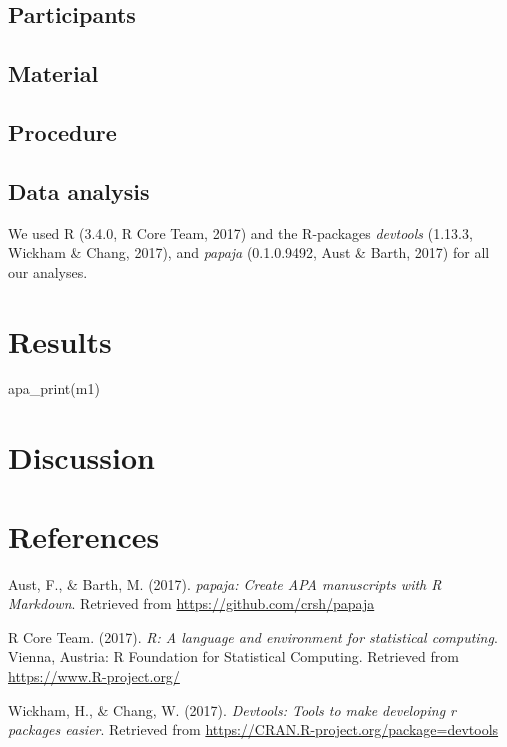 \documentclass[english,man]{apa6}
\theoremstyle{definition}
\theoremstyle{definition}
\theoremstyle{remark}
\begin{document}
\subsection{Participants}\label{participants}

\subsection{Material}\label{material}

\subsection{Procedure}\label{procedure}

\subsection{Data analysis}\label{data-analysis}

We used R (3.4.0, R Core Team, 2017) and the R-packages \emph{devtools}
(1.13.3, Wickham \& Chang, 2017), and \emph{papaja} (0.1.0.9492, Aust \&
Barth, 2017) for all our analyses.

\section{Results}\label{results}

apa\_print(m1)

\section{Discussion}\label{discussion}

\newpage

\section{References}\label{references}

\setlength{\parindent}{-0.5in} \setlength{\leftskip}{0.5in}

\hypertarget{refs}{}
\hypertarget{ref-R-papaja}{}
Aust, F., \& Barth, M. (2017). \emph{papaja: Create APA manuscripts with
R Markdown}. Retrieved from \url{https://github.com/crsh/papaja}

\hypertarget{ref-R-base}{}
R Core Team. (2017). \emph{R: A language and environment for statistical
computing}. Vienna, Austria: R Foundation for Statistical Computing.
Retrieved from \url{https://www.R-project.org/}

\hypertarget{ref-R-devtools}{}
Wickham, H., \& Chang, W. (2017). \emph{Devtools: Tools to make
developing r packages easier}. Retrieved from
\url{https://CRAN.R-project.org/package=devtools}
\end{document}
